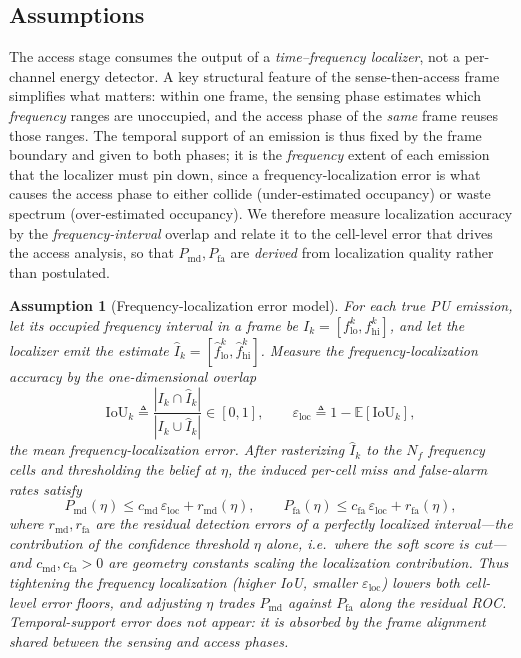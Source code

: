 \documentclass[journal]{IEEEtran}
\newtheorem{assumption}{Assumption}
\newcommand{\E}{\mathbb{E}}
\newcommand{\defeq}{\triangleq}
\newcommand{\Nf}{N_f}                      %
\newcommand{\Pmd}{P_{\mathrm{md}}}         %
\newcommand{\Pfa}{P_{\mathrm{fa}}}         %
\newcommand{\thr}{\eta}                    %
\newcommand{\iou}{\mathrm{IoU}}
\newcommand{\eloc}{\varepsilon_{\mathrm{loc}}}
\newcommand{\cmd}{c_{\mathrm{md}}}
\newcommand{\cfa}{c_{\mathrm{fa}}}
\newcommand{\rmd}{r_{\mathrm{md}}}
\newcommand{\rfa}{r_{\mathrm{fa}}}
\newcommand{\fint}{I}
\newcommand{\flo}{f_{\mathrm{lo}}}
\newcommand{\fhi}{f_{\mathrm{hi}}}
\begin{document}
\subsection{Assumptions}
\label{subsec:assumptions}

The access stage consumes the output of a \emph{time--frequency localizer},
not a per-channel energy detector. A key structural feature of the
sense-then-access frame simplifies what matters: within one frame, the
sensing phase estimates which \emph{frequency} ranges are unoccupied, and the
access phase of the \emph{same} frame reuses those ranges. The temporal
support of an emission is thus fixed by the frame boundary and given to both
phases; it is the \emph{frequency} extent of each emission that the localizer
must pin down, since a frequency-localization error is what causes the access
phase to either collide (under-estimated occupancy) or waste spectrum
(over-estimated occupancy). We therefore measure localization accuracy by the
\emph{frequency-interval} overlap and relate it to the cell-level error that
drives the access analysis, so that $\Pmd,\Pfa$ are \emph{derived} from
localization quality rather than postulated.

\begin{assumption}[Frequency-localization error model]
\label{as:localization}
For each true PU emission, let its occupied frequency interval in a frame be
$\fint_k=[\flo^{k},\fhi^{k}]$, and let the localizer emit the estimate
$\hat\fint_k=[\hat\flo^{k},\hat\fhi^{k}]$. Measure the frequency-localization
accuracy by the one-dimensional overlap
\begin{equation}
\iou_k\defeq\frac{|\fint_k\cap\hat\fint_k|}{|\fint_k\cup\hat\fint_k|}\in[0,1],
\qquad
\eloc\defeq 1-\E[\iou_k],
\label{eq:freq_iou}
\end{equation}
the mean frequency-localization error. After rasterizing $\hat\fint_k$ to the
$\Nf$ frequency cells and thresholding the belief at $\thr$, the induced
per-cell miss and false-alarm rates satisfy
\begin{equation}
\Pmd(\thr)\le \cmd\,\eloc + \rmd(\thr),
\qquad
\Pfa(\thr)\le \cfa\,\eloc + \rfa(\thr),
\label{eq:loc_to_cell}
\end{equation}
where $\rmd,\rfa$ are the residual detection errors of a perfectly localized
interval---the contribution of the \emph{confidence threshold} $\thr$ alone,
i.e.\ where the soft score is cut---and $\cmd,\cfa>0$ are geometry
constants scaling the \emph{localization} contribution. Thus tightening the
frequency localization (higher IoU, smaller $\eloc$) lowers both cell-level
error floors, and adjusting $\thr$ trades $\Pmd$ against $\Pfa$ along the
residual ROC. Temporal-support error does not appear: it is absorbed by the
frame alignment shared between the sensing and access phases.
\end{assumption}
\end{document}
